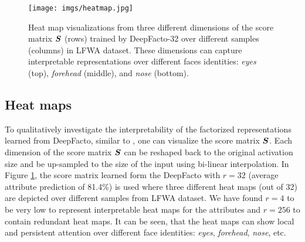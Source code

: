\begin{figure}[htb]
\vskip -0.05in
\begin{center}
\centerline{
\texttt{[image: imgs/heatmap.jpg]}
}
\caption{Heat map visualizations from three different dimensions of the score matrix ${\bm{S}}$ (rows) trained by DeepFacto-32 over different samples (columns) in LFWA dataset. These dimensions can capture interpretable representations over different faces identities: \emph{eyes} (top), \emph{forehead} (middle), and \emph{nose} (bottom).}
\label{fig:heatmap}
\end{center}
\vskip -0.15in
\end{figure}




\subsection*{Heat maps}\label{sec:heatmap}
To qualitatively investigate the interpretability of the factorized representations learned from DeepFacto, similar to \cite{collins2018deep}, one can visualize the score matrix ${\bm{S}}$. Each dimension of the score matrix ${\bm{S}}$ can be reshaped back to the original activation size and be up-sampled to the size of the input using bi-linear interpolation. In Figure \ref{fig:heatmap}, the score matrix learned form the DeepFacto with $r=32$ (average attribute prediction of 81.4\%) is used where three different heat maps (out of 32) are depicted over different samples from LFWA dataset. We have found $r=4$ to be very low to represent interpretable heat maps for the attributes and $r=256$ to contain redundant heat maps. It can be seen, that the heat maps can show local and persistent attention over different face identities: \emph{eyes}, \emph{forehead}, \emph{nose}, etc.


